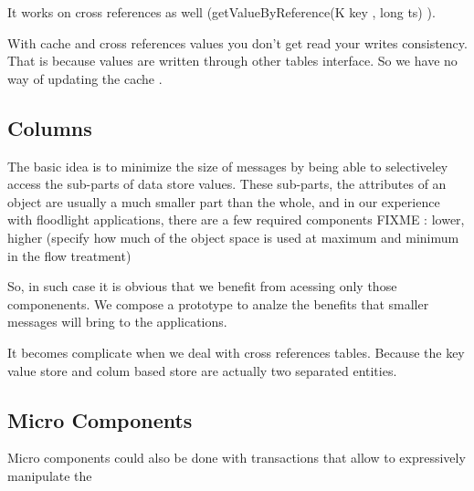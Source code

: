It works on cross references as well (getValueByReference(K key , long
ts) ). 


With cache and cross references values you don't get read your writes
consistency. That is because values are written through other tables
interface. So we have no way of updating the cache . 

\subsection{Columns}
The basic idea is to minimize the size of messages by being able to
selectiveley access the sub-parts of data store values. These
sub-parts, the attributes of an object are usually a much smaller part
than the whole, and in our experience with floodlight applications,
there are a few required components  FIXME : lower, higher  (specify
how much of the object space is used at maximum and minimum in the
flow treatment)

So, in such case it is obvious that we benefit from acessing only
those componenents. We compose a prototype to analze the benefits
that smaller messages will bring to the applications. 


It becomes complicate when we deal with cross references
tables. Because the key value store and colum based store are actually
two separated entities. 

\subsection{Micro Components}
Micro components could also be done with transactions that allow to
expressively manipulate the 
